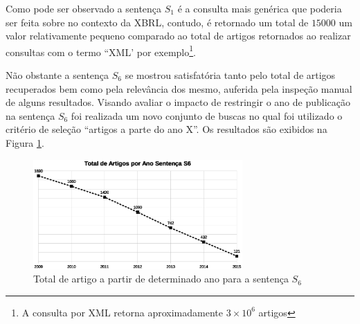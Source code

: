 \documentclass{article}
\begin{document}
\begin{table}[]
\centering
{}
\caption{Total de artigos por sentença}
\label{tab:sentencas}
\end{table}

Como pode ser observado a sentença $S_1$ é a consulta mais genérica que poderia ser feita sobre no contexto da XBRL, contudo, é retornado um total de $15000$ um valor relativamente pequeno comparado ao total de artigos retornados ao realizar consultas com o termo ``XML' por exemplo\footnote{A consulta por XML retorna aproximadamente $3 \times 10^{6}$ artigos}.

Não obstante a sentença $S_6$ se mostrou satisfatória tanto pelo total
de artigos recuperados bem como pela relevância dos mesmo, auferida
pela inspeção manual de alguns resultados. Visando avaliar o impacto
de restringir o ano de publicação na sentença $S_6$ foi realizada um
novo conjunto de buscas no qual foi utilizado o critério de seleção
``artigos a parte do ano X''.  Os resultados são exibidos na Figura \ref{fig:graph_artigos_ano}{}.

\begin{figure}[htb]
\label{fig:graph_artigos_ano}
\includegraphics[width=8cm]{../img/graph_01.eps}
\caption{Total de artigo a partir de determinado ano para a sentença $S_6$}
\centering
\end{figure}
\end{document}
